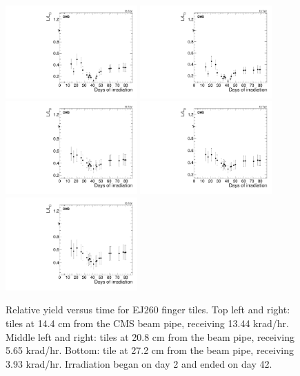 \begin{figure}[tbp!]
\centering
\includegraphics[width=0.45\textwidth]{figures/EJ260-F-14p4cm-f6ch0-time.pdf}
\includegraphics[width=0.45\textwidth]{figures/EJ260-F-14p4cm-f8ch1-time.pdf}
\includegraphics[width=0.45\textwidth]{figures/EJ260-F-20p8cm-f3ch4-time.pdf}
\includegraphics[width=0.45\textwidth]{figures/EJ260-F-20p8cm-f7ch1-time.pdf}
\includegraphics[width=0.45\textwidth]{figures/EJ260-F-27p2cm-f8ch3-time.pdf}
\caption{Relative yield versus time for EJ260 finger tiles. Top left and right: tiles at 14.4 cm from the CMS beam pipe, receiving 13.44 krad/hr. Middle left and right: tiles at 20.8 cm from the beam pipe, receiving 5.65 krad/hr. Bottom: tile at 27.2 cm from the beam pipe, receiving 3.93 krad/hr. Irradiation began on day 2 and ended on day 42.}
\label{fig:EJ260-F-time}
\end{figure} 

